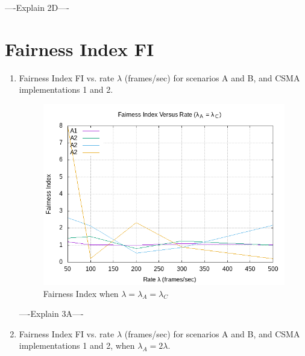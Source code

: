 \documentclass[12pt]{article}
\begin{document}
\begin{enumerate}
{            ----Explain 2D----
        }        
    
    
    \end{enumerate}
    
    
\clearpage
    \section{Fairness Index FI}

    \begin{enumerate}
    
        \item {
            Fairness Index FI vs. rate \(\lambda{}\) (frames/sec) for scenarios A and B, and CSMA implementations 1 and 2.
            
            \begin{figure}[!htb]
                \centering
                \includegraphics[width=5in]{3A.png}
                \caption{Fairness Index when \(\lambda{} = \lambda{}_A = \lambda{}_C\) }
                \label{fig:3A}
            \end{figure}

            ----Explain 3A----
        }    
    
    
\clearpage  
        \item {
            Fairness Index FI vs. rate \(\lambda{}\) (frames/sec) for scenarios A and B, and CSMA implementations 1 and 2, when \(\lambda{}_A = 2\lambda{}\).
            
}
\end{enumerate}
\end{document}
